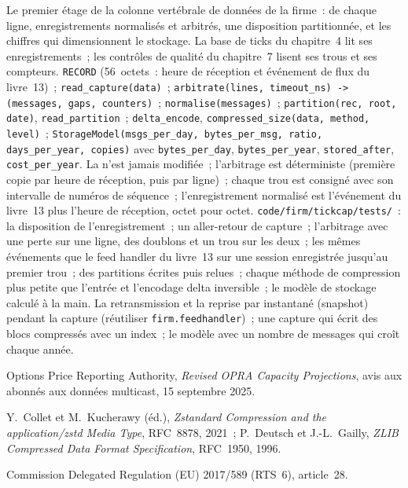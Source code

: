 \begin{build}
 Le premier étage de la colonne vertébrale de données de la firme~:  de chaque ligne, enregistrements normalisés et arbitrés, une
disposition partitionnée, et les chiffres qui dimensionnent le stockage. La base de ticks du chapitre~4 lit ses enregistrements~; les contrôles de qualité du chapitre~7
lisent ses trous et ses compteurs.
 \texttt{RECORD} (56~octets~: heure de réception et événement de flux du livre~13)~; \texttt{read\_capture(data)}~;
\texttt{arbitrate(lines, timeout\_ns) -> (messages, gaps, counters)}~; \texttt{normalise(messages)}~;
\texttt{partition(rec, root, date)}, \texttt{read\_partition}~; \texttt{delta\_encode},
\texttt{compressed\_size(data, method, level)}~; \texttt{StorageModel(msgs\_per\_day, bytes\_per\_msg, ratio, days\_per\_year, copies)} avec \texttt{bytes\_per\_day},
\texttt{bytes\_per\_year}, \texttt{stored\_after}, \texttt{cost\_per\_year}.
 La  n'est jamais modifiée~; l'arbitrage est déterministe (première copie par heure de réception, puis par ligne)~; chaque
trou est consigné avec son intervalle de numéros de séquence~; l'enregistrement normalisé est l'événement du livre~13 plus l'heure de réception, octet pour octet.
 \texttt{code/firm/tickcap/tests/}~: la disposition de l'enregistrement~; un aller-retour de capture~; l'arbitrage avec une perte sur
une ligne, des doublons et un trou sur les deux~; les mêmes événements que le feed handler du livre~13 sur une session enregistrée jusqu'au premier trou~;
des partitions écrites puis relues~; chaque méthode de compression plus petite que l'entrée et l'encodage delta inversible~; le
modèle de stockage calculé à la main.
 La retransmission et la reprise par instantané (snapshot) pendant la capture (réutiliser \texttt{firm.feedhandler})~; une capture qui écrit
des blocs compressés avec un index~; le modèle avec un nombre de messages qui croît chaque année.
\end{build}

\begin{omsources}
\item Options Price Reporting Authority, \emph{Revised OPRA Capacity Projections}, avis aux abonnés aux données multicast,
15 septembre 2025.
\item Y.~Collet et M.~Kucherawy (éd.), \emph{Zstandard Compression and the application/zstd Media Type}, RFC~8878, 2021~;
P.~Deutsch et J.-L.~Gailly, \emph{ZLIB Compressed Data Format Specification}, RFC~1950, 1996.
\item Commission Delegated Regulation (EU) 2017/589 (RTS~6), article~28.
\end{omsources}

